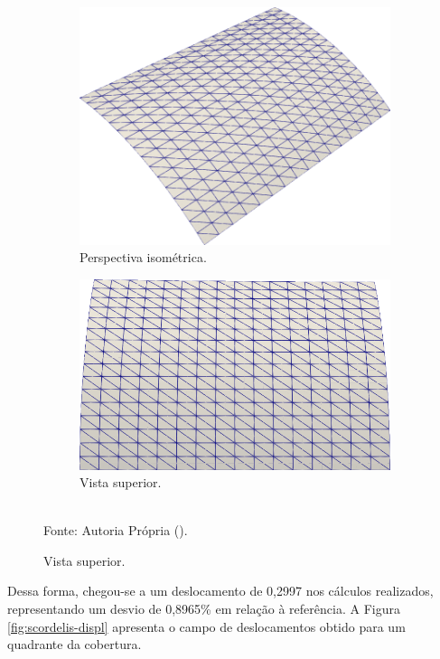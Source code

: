 \begin{figure}[h!]
    \centering
    \caption{Malha utilizada na simulação de \textit{Scordelis-Lo roof}.}
    \begin{subfigure}{0.35\textwidth}
        \includegraphics[width=\linewidth]{Figuras/scordelis/malha1.png}
        \caption{Perspectiva isométrica.}
    \end{subfigure}
    \begin{subfigure}{0.35\textwidth}
        \includegraphics[width=\linewidth]{Figuras/scordelis/malha2.png}
        \caption{Vista superior.}
    \end{subfigure}
    \\Fonte: Autoria Própria (\the\year).
    \label{fig:scordelis-mesh}
\end{figure}

Dessa forma, chegou-se a um deslocamento de 0,2997 nos cálculos realizados, representando um desvio de 0,8965\% em relação à referência. A Figura \ref{fig:scordelis-displ} apresenta o campo de deslocamentos obtido para um quadrante da cobertura.

